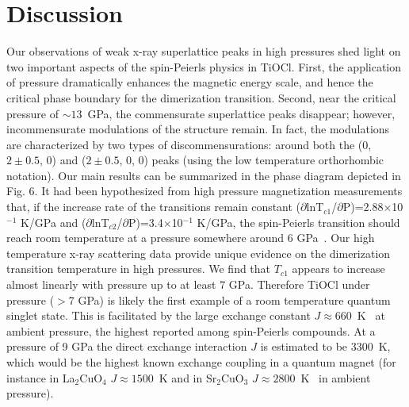 \documentclass[preprint,superscriptaddress,amsmath,amssymb,aps,prl]{revtex4-1}
\begin{document}
\section*{Discussion}
Our observations of weak x-ray superlattice peaks in high pressures shed light on two important aspects of the spin-Peierls physics in TiOCl. First, the application of pressure dramatically enhances the magnetic energy scale, and hence the critical phase boundary for the dimerization transition. Second, near the critical pressure of $\sim13$~GPa, the commensurate superlattice peaks disappear; however, incommensurate modulations of the structure remain. In fact, the modulations are characterized by two types of discommensurations: around both the (0, $2\pm 0.5$, 0) and ($2\pm 0.5$, 0, 0) peaks (using the low temperature orthorhombic notation). Our main results can be summarized in the phase diagram depicted in Fig. 6. It had been hypothesized from high pressure magnetization measurements that, if the increase rate of the transitions remain constant ($\partial$lnT$_{c1}$/$\partial$P)=2.88$\times$10$^{-1}$ K/GPa and ($\partial$lnT$_{c2}$/$\partial$P)=3.4$\times$10$^{-1}$ K/GPa, the spin-Peierls transition should reach room temperature at a pressure somewhere around 6 GPa~\cite{Blanco2009}. Our high temperature x-ray scattering data provide unique evidence on the dimerization transition temperature in high pressures. We find that $T_{c1}$ appears to increase almost linearly with pressure up to at least 7 GPa. Therefore TiOCl under pressure ($>$7 GPa) is likely the first example of a room temperature quantum singlet state. This is facilitated by the large exchange constant $J\approx660$~K~\cite{Seidel2003,Kataev2003} at ambient pressure, the highest reported among spin-Peierls compounds. At a pressure of 9 GPa the direct exchange interaction $J$ is estimated to be 3300~K, which would be the highest known exchange coupling in a quantum magnet (for instance in La$_{2}$CuO$_{4}$ $J\approx1500$~K and in Sr$_2$CuO$_3$ $J\approx2800$~K~\cite{Igor2009} in ambient pressure).
\end{document}
